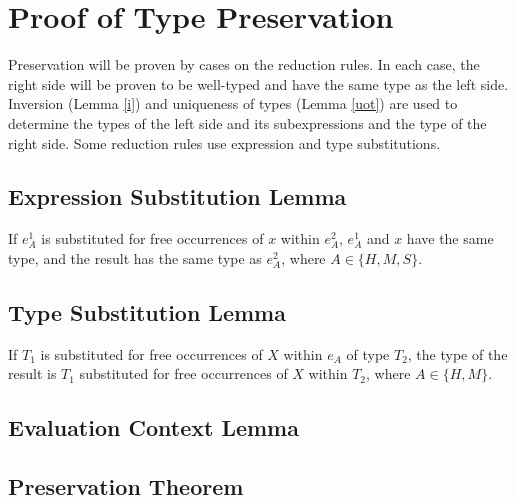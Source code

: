

\section{Proof of Type Preservation}

Preservation will be proven by cases on the reduction rules.  In each case, the right side will be proven to be well-typed and have the same type as the left side.  Inversion (Lemma \ref{i}) and uniqueness of types (Lemma \ref{uot}) are used to determine the types of the left side and its subexpressions and the type of the right side.  Some reduction rules use expression and type substitutions.

\subsection{Expression Substitution Lemma}

If $e_{A}^{1}$ is substituted for free occurrences of $x$ within $e_{A}^{2}$, $e_{A}^{1}$ and $x$ have the same type, and the result has the same type as $e_{A}^{2}$, where $A\in\lbrace H,M,S\rbrace$.



\subsection{Type Substitution Lemma}

If $T_{1}$ is substituted for free occurrences of $X$ within $e_{A}$ of type $T_{2}$, the type of the result is $T_{1}$ substituted for free occurrences of $X$ within $T_{2}$, where $A\in\lbrace H,M\rbrace$.



\subsection{Evaluation Context Lemma}



\subsection{Preservation Theorem}

